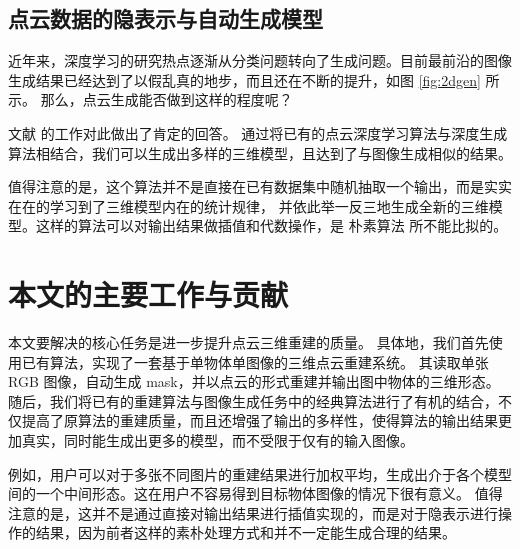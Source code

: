 \subsection{点云数据的隐表示与自动生成模型}
近年来，深度学习的研究热点逐渐从分类问题转向了生成问题。目前最前沿的图像生成结果已经达到了以假乱真的地步，而且还在不断的提升，如图 \ref{fig:2dgen} 所示。
那么，点云生成能否做到这样的程度呢？

文献  的工作对此做出了肯定的回答。
通过将已有的点云深度学习算法与深度生成算法相结合，我们可以生成出多样的三维模型，且达到了与图像生成相似的结果。

值得注意的是，这个算法并不是直接在已有数据集中随机抽取一个输出，而是实实在在的学习到了三维模型内在的统计规律，
并依此举一反三地生成全新的三维模型。这样的算法可以对输出结果做插值和代数操作，是
朴素算法
所不能比拟的。




\section{本文的主要工作与贡献}




本文要解决的核心任务是进一步提升点云三维重建的质量。
具体地，我们首先使用已有算法，实现了一套基于单物体单图像的三维点云重建系统。
其读取单张 RGB 图像，自动生成 mask，并以点云的形式重建并输出图中物体的三维形态。
随后，我们将已有的重建算法与图像生成任务中的经典算法进行了有机的结合，不仅提高了原算法的重建质量，而且还增强了输出的多样性，使得算法的输出结果更加真实，同时能生成出更多的模型，而不受限于仅有的输入图像。

例如，用户可以对于多张不同图片的重建结果进行加权平均，生成出介于各个模型间的一个中间形态。这在用户不容易得到目标物体图像的情况下很有意义。
值得注意的是，这并不是通过直接对输出结果进行插值实现的，而是对于隐表示进行操作的结果，因为前者这样的素朴处理方式和并不一定能生成合理的结果。

